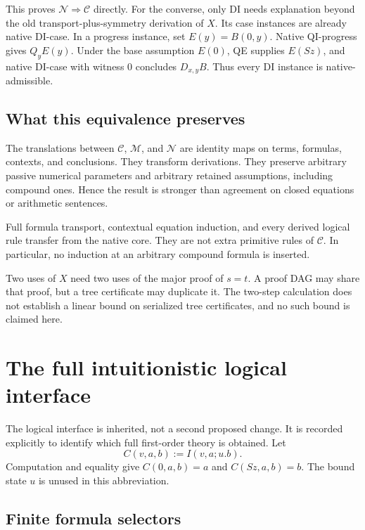 \documentclass[11pt]{article}
\theoremstyle{definition}\newtheorem{definition}[theorem]{Definition}
\theoremstyle{remark}\newtheorem{remark}[theorem]{Remark}
\newcommand{\C}{\mathcal C}
\newcommand{\N}{\mathcal N}
\newcommand{\M}{\mathcal M}
\begin{document}
This proves $\N\Rightarrow\C$ directly. For the converse, only DI
needs explanation beyond the old transport-plus-symmetry derivation of
$X$. Its case instances are already native DI-case. In a progress
instance, set $E(y)=B(0,y)$. Native QI-progress gives $Q_yE(y)$.
Under the base assumption $E(0)$, QE supplies $E(Sz)$, and native
DI-case with witness $0$ concludes $D_{x,y}B$. Thus every DI instance
is native-admissible.

\subsection{What this equivalence preserves}

The translations between $\C$, $\M$, and $\N$ are identity maps on
terms, formulas, contexts, and conclusions. They transform derivations.
They preserve arbitrary passive numerical parameters and arbitrary
retained assumptions, including compound ones. Hence the result is
stronger than agreement on closed equations or arithmetic sentences.

Full formula transport, contextual equation induction, and every
derived logical rule transfer from the native core. They are not extra
primitive rules of $\C$. In particular, no induction at an arbitrary
compound formula is inserted.

Two uses of $X$ need two uses of the major proof of $s=t$. A proof DAG
may share that proof, but a tree certificate may duplicate it. The
two-step calculation does not establish a linear bound on serialized
tree certificates, and no such bound is claimed here.

\section{The full intuitionistic logical interface}

The logical interface is inherited, not a second proposed change. It is
recorded explicitly to identify which full first-order theory is
obtained. Let
\[
  C(v,a,b):=I(v,a;u.b).
\]
Computation and equality give $C(0,a,b)=a$ and $C(Sz,a,b)=b$.
The bound state $u$ is unused in this abbreviation.

\subsection{Finite formula selectors}
\end{document}

